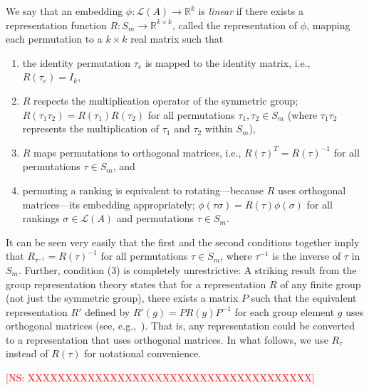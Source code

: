 \documentclass[prodmode,acmec]{ec-acmsmall}
\newcommand{\calL}{{\mathcal{L}}}
\newcommand{\rank}{{\calL(A)}}
\newcommand{\kibitz}[2]{\ifnum\Comments=1\textcolor{#1}{#2}\fi}
\newcommand{\ns}[1]{\kibitz{red} {[NS: #1]}}
\begin{document}
\begin{definition}
We say that an embedding $\phi:\rank \rightarrow \mathbb{R}^k$ is \emph{linear} if there exists a representation function $R : S_m \rightarrow \mathbb{R}^{k \times k}$, called the representation of $\phi$, mapping each permutation to a $k \times k$ real matrix such that 
\begin{enumerate}
\item the identity permutation $\tau_e$ is mapped to the identity matrix, i.e., $R(\tau_e) = I_k$,
\item $R$ respects the multiplication operator of the symmetric group; $R(\tau_1 \tau_2) = R(\tau_1) R(\tau_2)$ for all permutations $\tau_1,\tau_2 \in S_m$ (where $\tau_1 \tau_2$ represents the multiplication of $\tau_1$ and $\tau_2$ within $S_m$), 
\item $R$ maps permutations to orthogonal matrices, i.e., $R(\tau)^T = R(\tau)^{-1}$ for all permutations $\tau \in S_m$, and
\item permuting a ranking is equivalent to rotating---because $R$ uses orthogonal matrices---its embedding appropriately; $\phi(\tau \sigma) = R(\tau) \phi(\sigma)$ for all rankings $\sigma \in \rank$ and permutations $\tau \in S_m$.
\end{enumerate}
\end{definition}

It can be seen very easily that the first and the second conditions together imply that $R_{\tau^{-1}} = R(\tau)^{-1}$ for all permutations $\tau \in S_m$, where $\tau^{-1}$ is the inverse of $\tau$ in $S_m$. Further, condition (3) is completely unrestrictive: A striking result from the group representation theory states that for a representation $R$ of any finite group (not just the symmetric group), there exists a matrix $P$ such that the equivalent representation $R'$ defined by $R'(g) = P R(g) P^{-1}$ for each group element $g$ uses orthogonal matrices (see, e.g.,~\cite[Theorem~6.3]{BMWM63}). That is, any representation could be converted to a representation that uses orthogonal matrices. In what follows, we use $R_{\tau}$ instead of $R(\tau)$ for notational convenience. 

\ns{XXXXXXXXXXXXXXXXXXXXXXXXXXXXXXXXXXXXXX}
\end{document}
